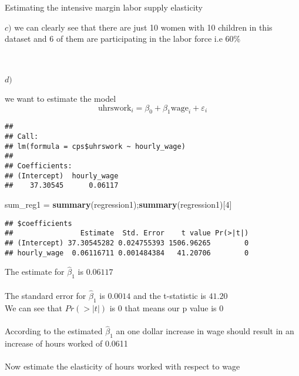 \documentclass[
  ignorenonframetext,
]{beamer}
\newenvironment{Shaded}{\begin{snugshade}}{\end{snugshade}}
\newcommand{\DecValTok}[1]{\textcolor[rgb]{0.00,0.00,0.81}{#1}}
\newcommand{\KeywordTok}[1]{\textcolor[rgb]{0.13,0.29,0.53}{\textbf{#1}}}
\newcommand{\NormalTok}[1]{#1}
\newcommand{\OperatorTok}[1]{\textcolor[rgb]{0.81,0.36,0.00}{\textbf{#1}}}
\newcommand{\StringTok}[1]{\textcolor[rgb]{0.31,0.60,0.02}{#1}}
\begin{document}
\begin{frame}[fragile]{Estimating the intensive margin labor supply
elasticity}
\begin{block}{\(c)\)}
we can clearly see that there are just 10 women with 10 children in this
dataset and 6 of them are participating in the labor force i.e
\(60\)\%\\
~\\
~\\
\end{block}

\begin{block}{\(d)\)}
\protect\hypertarget{d}{}
\hfill\break

we want to estimate the model
\[\textrm{uhrswork}_i = \beta_0 + \beta_1 \textrm{wage}_i + \varepsilon_i\]

\begin{Shaded}
\end{Shaded}

\begin{verbatim}
## 
## Call:
## lm(formula = cps$uhrswork ~ hourly_wage)
## 
## Coefficients:
## (Intercept)  hourly_wage  
##    37.30545      0.06117
\end{verbatim}

\begin{Shaded}
\begin{Highlighting}[]
\NormalTok{sum\_reg1 =}\StringTok{ }\KeywordTok{summary}\NormalTok{(regression1);}\KeywordTok{summary}\NormalTok{(regression1)[}\DecValTok{4}\NormalTok{]}
\end{Highlighting}
\end{Shaded}

\begin{verbatim}
## $coefficients
##                Estimate  Std. Error    t value Pr(>|t|)
## (Intercept) 37.30545282 0.024755393 1506.96265        0
## hourly_wage  0.06116711 0.001484384   41.20706        0
\end{verbatim}

The estimate for \(\hat{\beta}_1\) is \(0.06117\)\\
~\\
The standard error for \(\hat{\beta}_1\) is \(0.0014\) and the
t-statistic is \(41.20\)\\
We can see that \(Pr(>|t|)\) is \(0\) that means our p value is 0\\
~\\
According to the estimated \(\hat{\beta}_1\) an one dollar increase in
wage should result in an increase of hours worked of 0.0611\\
~\\
Now estimate the elasticity of hours worked with respect to wage


\end{block}
\end{frame}
\end{document}
